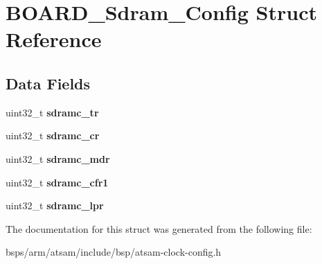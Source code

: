 \hypertarget{structBOARD__Sdram__Config}{}\section{B\+O\+A\+R\+D\+\_\+\+Sdram\+\_\+\+Config Struct Reference}
\label{structBOARD__Sdram__Config}
\subsection*{Data Fields}
\begin{DoxyCompactItemize}
\item 
\mbox{\label{structBOARD__Sdram__Config_a03c70ce2b70a3c172790415c42ae7b93}} 
uint32\+\_\+t {\bfseries sdramc\+\_\+tr}
\item 
\mbox{\label{structBOARD__Sdram__Config_ac97a3e9858c97481cbabc13ee80d00bf}} 
uint32\+\_\+t {\bfseries sdramc\+\_\+cr}
\item 
\mbox{\label{structBOARD__Sdram__Config_acf65489d10768adf5ddfd559d39317c4}} 
uint32\+\_\+t {\bfseries sdramc\+\_\+mdr}
\item 
\mbox{\label{structBOARD__Sdram__Config_a7542db9f76631782a5d86862689bf181}} 
uint32\+\_\+t {\bfseries sdramc\+\_\+cfr1}
\item 
\mbox{\label{structBOARD__Sdram__Config_abfb376936e296899688cb32cd3871728}} 
uint32\+\_\+t {\bfseries sdramc\+\_\+lpr}
\end{DoxyCompactItemize}


The documentation for this struct was generated from the following file\+:\begin{DoxyCompactItemize}
\item 
bsps/arm/atsam/include/bsp/atsam-\/clock-\/config.\+h\end{DoxyCompactItemize}
